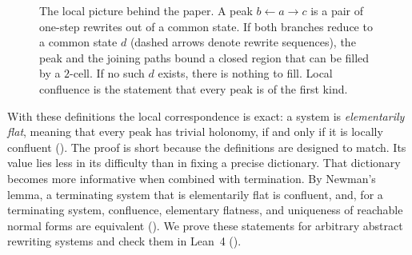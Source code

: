 \begin{figure}[t]
\centering
{}
\caption{The local picture behind the paper. A peak $b \leftarrow a \to c$ is a pair of one-step rewrites out of a common state. If both branches reduce to a common state $d$ (dashed arrows denote rewrite sequences), the peak and the joining paths bound a closed region that can be filled by a $2$-cell. If no such $d$ exists, there is nothing to fill. Local confluence is the statement that every peak is of the first kind.}
\label{fig:intro-filled-open}
\end{figure}

With these definitions the local correspondence is exact: a system is \emph{elementarily flat}, meaning that every peak has trivial holonomy, if and only if it is locally confluent (). The proof is short because the definitions are designed to match. Its value lies less in its difficulty than in fixing a precise dictionary. That dictionary becomes more informative when combined with termination. By Newman's lemma, a terminating system that is elementarily flat is confluent, and, for a terminating system, confluence, elementary flatness, and uniqueness of reachable normal forms are equivalent (). We prove these statements for arbitrary abstract rewriting systems and check them in Lean~4 ().

